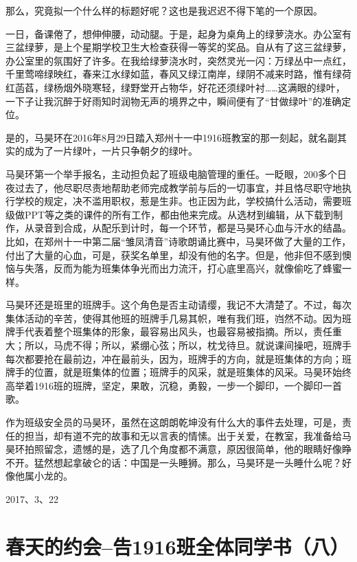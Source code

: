 \documentclass[openany]{ctexbook}
\begin{document}
那么，究竟拟一个什么样的标题好呢？这也是我迟迟不得下笔的一个原因。

一日，备课倦了，想伸伸腰，动动腿。于是，起身为桌角上的绿萝浇水。办公室有三盆绿萝，是上个星期学校卫生大检查获得一等奖的奖品。自从有了这三盆绿萝，办公室里的氛围好了许多。在我给绿萝浇水时，突然灵光一闪：万绿丛中一点红，千里莺啼绿映红，春来江水绿如蓝，春风又绿江南岸，绿阴不减来时路，惟有绿荷红菡萏，绿杨烟外晓寒轻，绿野堂开占物华，好花还须绿叶衬\ldots{}\ldots{}这满眼的绿叶，一下子让我沉醉于好雨知时润物无声的境界之中，瞬间便有了``甘做绿叶''的准确定位。

是的，马昊环在2016年8月29日踏入郑州十一中1916班教室的那一刻起，就名副其实的成为了一片绿叶，一片只争朝夕的绿叶。

马昊环第一个举手报名，主动担负起了班级电脑管理的重任。一眨眼，200多个日夜过去了，他尽职尽责地帮助老师完成教学前与后的一切事宜，并且恪尽职守地执行学校的规定，决不滥用职权，惹是生非。也正因为此，学校搞什么活动，需要班级做PPT等之类的课件的所有工作，都由他来完成。从选材到编辑，从下载到制作，从录音到合成，从配乐到计时，每一个环节，都是马昊环心血与汗水的结晶。比如，在郑州十一中第二届``雏凤清音''诗歌朗诵比赛中，马昊环做了大量的工作，付出了大量的心血，可是，获奖名单里，却没有他的名字。但是，他非但不感到懊恼与失落，反而为能为班集体争光而出力流汗，打心底里高兴，就像偷吃了蜂蜜一样。

马昊环还是班里的班牌手。这个角色是否主动请缨，我记不大清楚了。不过，每次集体活动的辛苦，使得其他班的班牌手几易其帜，唯有我们班，岿然不动。因为班牌手代表着整个班集体的形象，最容易出风头，也最容易被指摘。所以，责任重大；所以，马虎不得；所以，紧绷心弦；所以，枕戈待旦。就说课间操吧，班牌手每次都要抢在最前边，冲在最前头，因为，班牌手的方向，就是班集体的方向；班牌手的位置，就是班集体的位置；班牌手的风采，就是班集体的风采。马昊环始终高举着1916班的班牌，坚定，果敢，沉稳，勇毅，一步一个脚印，一个脚印一首歌。

作为班级安全员的马昊环，虽然在这朗朗乾坤没有什么大的事件去处理，可是，责任的担当，却有道不完的故事和无以言表的情愫。出于关爱，在教室，我准备给马昊环拍照留念，遗憾的是，选了几个角度都不满意，原因很简单，他的眼睛好像睁不开。猛然想起拿破仑的话：中国是一头睡狮。那么，马昊环是一头睡什么呢？好像他属小龙的。

2017、3、22

\chapter*{春天的约会--告1916班全体同学书（八）}\label{letter8}
\end{document}
